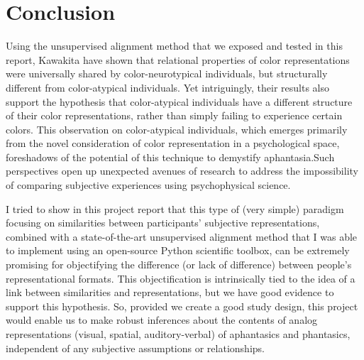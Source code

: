 \documentclass[
  authoryear]{elsarticle}
\begin{document}
\section*{Conclusion}\label{conclusion}

Using the unsupervised alignment method that we exposed and tested in
this report, Kawakita have shown that relational properties of color
representations were universally shared by color-neurotypical
individuals, but structurally different from color-atypical individuals.
Yet intriguingly, their results also support the hypothesis that
color-atypical individuals have a different structure of their color
representations, rather than simply failing to experience certain
colors. This observation on color-atypical individuals, which emerges
primarily from the novel consideration of color representation in a
psychological space, foreshadows of the potential of this technique to
demystify aphantasia.Such perspectives open up unexpected avenues of
research to address the impossibility of comparing subjective
experiences using psychophysical science.

I tried to show in this project report that this type of (very simple)
paradigm focusing on similarities between participants' subjective
representations, combined with a state-of-the-art unsupervised alignment
method that I was able to implement using an open-source Python
scientific toolbox, can be extremely promising for objectifying the
difference (or lack of difference) between people's representational
formats. This objectification is intrinsically tied to the idea of a
link between similarities and representations, but we have good evidence
to support this hypothesis. So, provided we create a good study design,
this project would enable us to make robust inferences about the
contents of analog representations (visual, spatial, auditory-verbal) of
aphantasics and phantasics, independent of any subjective assumptions or
relationships.


  
\end{document}
